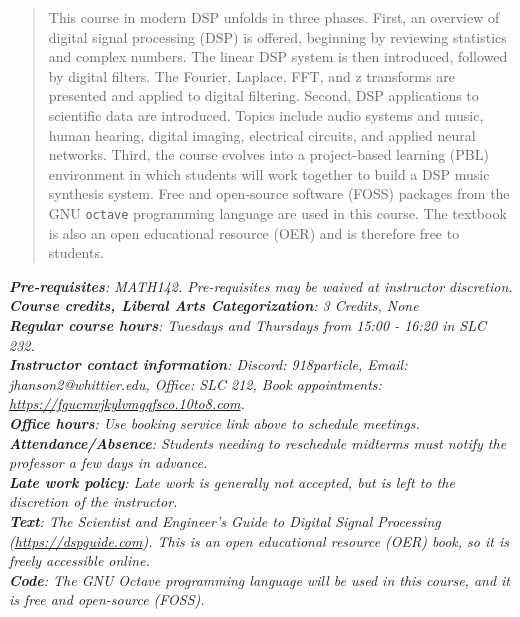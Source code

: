 \documentclass[10pt]{article}
\begin{document}
\maketitle

\begin{abstract}
This course in modern DSP unfolds in three phases.  First, an overview of digital signal processing (DSP) is offered, beginning by reviewing statistics and complex numbers. The linear DSP system is then introduced, followed by digital filters. The Fourier, Laplace, FFT, and z transforms are presented and applied to digital filtering. Second, DSP applications to scientific data are introduced. Topics include audio systems and music, human hearing, digital imaging, electrical circuits, and applied neural networks. Third, the course evolves into a project-based learning (PBL) environment in which students will work together to build a DSP music synthesis system.  Free and open-source software (FOSS) packages from the GNU \verb+octave+ programming language are used in this course.  The textbook is also an open educational resource (OER) and is therefore free to students.
\end{abstract}
\noindent
\textit{\textbf{Pre-requisites}: MATH142.  Pre-requisites may be waived at instructor discretion.} \\
\textit{\textbf{Course credits, Liberal Arts Categorization}: 3 Credits, None} \\
\textit{\textbf{Regular course hours}: Tuesdays and Thursdays from 15:00 - 16:20 in SLC 232.} \\
\textit{\textbf{Instructor contact information}: Discord: 918particle, Email: jhanson2@whittier.edu, Office: SLC 212, Book appointments: \url{https://fgucmvjkylvmgqfsco.10to8.com}.} \\
\textit{\textbf{Office hours}: Use booking service link above to schedule meetings.} \\
\textit{\textbf{Attendance/Absence}: Students needing to reschedule midterms must notify the professor a few days in advance.} \\ 
\textit{\textbf{Late work policy}: Late work is generally not accepted, but is left to the discretion of the instructor.} \\
\textit{\textbf{Text}: The Scientist and Engineer's Guide to Digital Signal Processing (\url{https://dspguide.com}).  This is an open educational resource (OER) book, so it is freely accessible online.} \\
\textit{\textbf{Code}: The GNU Octave programming language will be used in this course, and it is free and open-source (FOSS).} \\
\end{document}

